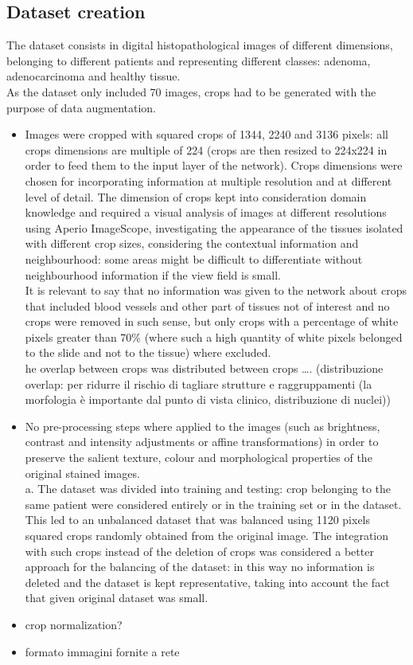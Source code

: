 \documentclass[12pt]{article}
\begin{document}
\subsection{Dataset creation}
The dataset consists in digital histopathological images of different dimensions, belonging to different patients and representing different classes: adenoma, adenocarcinoma and healthy tissue. \\
As the dataset only included 70 images, crops had to be generated with the purpose of data augmentation.
\begin{itemize}
	\item Images were cropped with squared crops of 1344, 2240 and 3136 pixels: all crops dimensions are multiple of 224 (crops are then resized to 224x224 in order to feed them to the input layer of the network). Crops dimensions were chosen for incorporating information at multiple resolution and at different level of detail. 
	The dimension of crops kept into consideration domain knowledge and required a visual analysis of images at different resolutions using Aperio ImageScope, investigating the appearance of the tissues isolated with different crop sizes, considering the contextual information and neighbourhood: some areas might be difficult to differentiate without neighbourhood information if the view field is small. \\It is relevant to say that no information was given to the network about crops that included blood vessels and other part of tissues not of interest and no crops were removed in such sense, but only crops with a percentage of white pixels greater than 70\% (where such a high quantity of white pixels belonged to the slide and not to the tissue) where excluded. \\
	he overlap between crops was distributed between crops …. (distribuzione overlap: per ridurre il rischio di tagliare strutture e raggruppamenti (la morfologia è importante dal punto di vista clinico, distribuzione di nuclei))
	\item No pre-processing steps where applied to the images (such as brightness, contrast and intensity adjustments or affine transformations) in order to preserve the salient texture, colour and morphological properties of the original stained images. \cite{bay2} \\ a.	The dataset was divided into training and testing: crop belonging to the same patient were considered entirely or in the training set or in the dataset. This led to an unbalanced dataset that was balanced using 1120 pixels squared crops randomly obtained from the original image. The integration with such crops instead of the deletion of crops was considered a better approach for the balancing of the dataset: in this way no information is deleted and the dataset is kept representative, taking into account the fact that given original dataset was small.
	\item crop normalization?
	\item formato immagini fornite a rete
\end{itemize}
\end{document}
